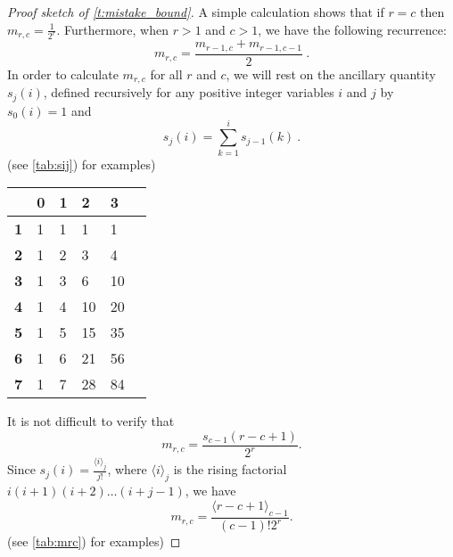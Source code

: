 \begin{proof}[Proof sketch of \autoref{t:mistake_bound}]
A simple calculation shows that if $r=c$ then $m_{r,c}=\frac{1}{2^r}$. Furthermore, when $r>1$ and $c>1$, 
we have the following recurrence:
\[
m_{r,c}=\frac{m_{r-1,c}+m_{r-1,c-1}}{2}~.
\]  
In order to calculate $m_{r,c}$ for all $r$ and $c$, we will rest on the ancillary quantity
$s_j(i)$, defined recursively for any positive integer variables $i$ and $j$ by
$ s_0(i)=1 $
and
\[
s_j(i)=\sum_{k=1}^i s_{j-1}(k)~.
\]
(see \autoref{tab:sij}) for examples)


\begin{center}
  \begin{tabular}{|c |M{.45cm}|M{.45cm}|M{.45cm}|M{.45cm}|N}
    \hline
     & \textbf{0}& \textbf{1} & \textbf{2} & \textbf{3}    &\\[13pt] \hline
    \textbf{1} & 1 & 1 & 1 & 1  &\\[13pt] \hline
    \textbf{2} & 1 & 2 & 3 & 4 &\\[13pt] \hline
    \textbf{3} & 1 & 3 & 6 & 10 &\\[13pt] \hline
    \textbf{4} & 1 & 4 & 10 & 20 &\\[13pt] \hline
    \textbf{5} & 1 & 5 & 15 & 35 &\\[13pt] \hline
    \textbf{6} & 1 & 6 & 21 & 56 &\\[13pt] \hline
    \textbf{7} & 1 & 7 & 28 & 84 &\\[13pt] \hline
  \end{tabular}
   \label{tab:sij} 
\end{center}

It is not difficult to verify that 
\[
m_{r,c}=\frac{s_{c-1}(r-c+1)}{2^{r}}. 
\]
Since $s_j(i)=\frac{\langle i\rangle_j}{j!}$, where $\langle i\rangle_j$ is the rising factorial
$i(i+1)(i+2)\ldots(i+j-1)$, we have 
\[
m_{r,c}=\frac{\langle r-c+1\rangle_{c-1}}{(c-1)!2^{r}}.
\] 
(see \autoref{tab:mrc}) for examples)



\end{proof}
